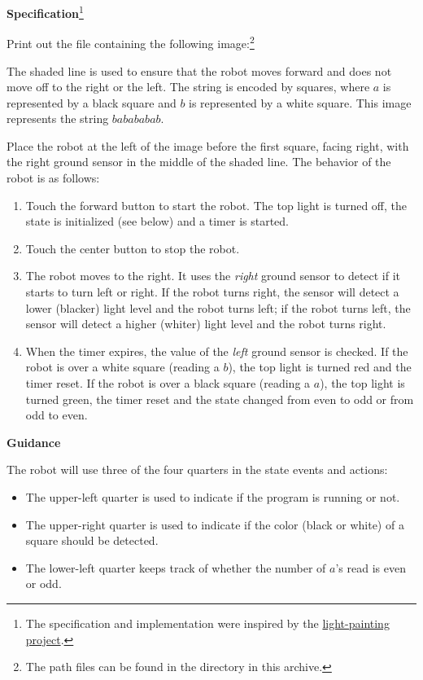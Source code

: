 \textbf{Specification}\footnote{The specification and implementation
were inspired by the \href{https://aseba.wikidot.com/en:barcodelightpainting}{light-painting project}.}

Print out the file  containing the
following image:\footnote{The path files can be found in the directory
 in this archive.}


The shaded line is used to ensure that the robot moves forward and does
not move off to the right or the left. The string is encoded by squares,
where $a$ is represented by a black square and $b$ is represented by a
white square. This image represents the string $babababab$.

Place the robot at the left of the image before the first square, facing
right, with the right ground sensor in the middle of the shaded line.
The behavior of the robot is as follows:

\begin{enumerate}

\item Touch the forward button to start the robot. The top light is
turned off, the state is initialized (see below) and a timer is started.

\item Touch the center button to stop the robot.

\item The robot moves to the right. It uses the \emph{right} ground
sensor to detect if it starts to turn left or right. If the robot turns
right, the sensor will detect a lower (blacker) light level and the
robot turns left; if the robot turns left, the sensor will detect a
higher (whiter) light level and the robot turns right.

\item When the timer expires, the value of the \emph{left} ground sensor
is checked. If the robot is over a white square (reading a $b$), the top
light is turned red and the timer reset. If the robot is over a black
square (reading a $a$), the top light is turned green, the timer reset
and the state changed from even to odd or from odd to even.

\end{enumerate}


\textbf{Guidance}

The robot will use three of the four quarters in the state events and
actions:

\begin{itemize}
\item The upper-left quarter is used to indicate if the program is
running or not.
\item The upper-right quarter is used to indicate if the color (black or
white) of a square should be detected.
\item The lower-left quarter keeps track of whether the
number of $a$'s read is even or odd.
\end{itemize}

